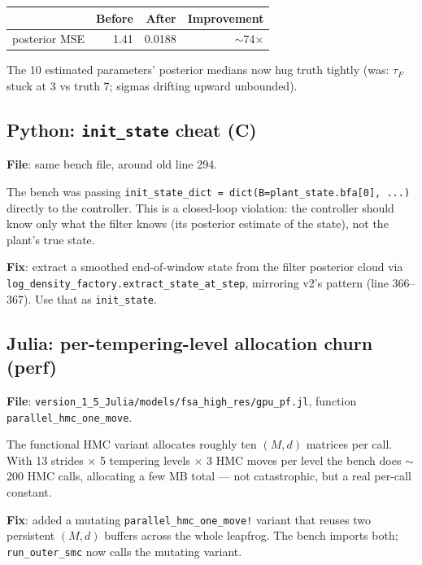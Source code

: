 \documentclass[11pt,a4paper]{article}
\begin{document}
\begin{center}
\begin{tabular}{lrrr}
  \toprule
                     & Before  & After    & Improvement \\
  \midrule
  posterior MSE      & 1.41    & 0.0188   & $\sim$74$\times$ \\
  \bottomrule
\end{tabular}
\end{center}

The 10 estimated parameters' posterior medians now hug truth
tightly (was: $\tau_F$ stuck at 3 vs truth 7; sigmas drifting
upward unbounded).

\subsection{Python: \texttt{init\_state} cheat (C)}

\textbf{File}: same bench file, around old line 294.

The bench was passing \texttt{init\_state\_dict =
dict(B=plant\_state.bfa[0], ...)} directly to the controller. This
is a closed-loop violation: the controller should know only what
the filter knows (its posterior estimate of the state), not the
plant's true state.

\textbf{Fix}: extract a smoothed end-of-window state from the
filter posterior cloud via \texttt{log\_density\_factory.extract\_state\_at\_step},
mirroring v2's pattern (line 366--367). Use that as
\texttt{init\_state}.

\subsection{Julia: per-tempering-level allocation churn (perf)}

\textbf{File}: \texttt{version\_1\_5\_Julia/models/fsa\_high\_res/gpu\_pf.jl},
function \texttt{parallel\_hmc\_one\_move}.

The functional HMC variant allocates roughly ten $(M, d)$
matrices per call. With 13 strides $\times$ 5 tempering levels
$\times$ 3 HMC moves per level the bench does $\sim$200 HMC
calls, allocating a few MB total --- not catastrophic, but a
real per-call constant.

\textbf{Fix}: added a mutating
\texttt{parallel\_hmc\_one\_move!} variant that reuses two
persistent $(M, d)$ buffers across the whole leapfrog. The bench
imports both; \texttt{run\_outer\_smc} now calls the mutating
variant.
\end{document}
